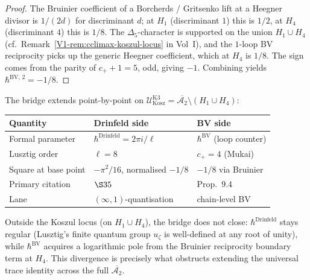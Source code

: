 \begin{proof}
The Bruinier coefficient of a Borcherds / Gritsenko lift at a Heegner
divisor is $1/(2d)$ for discriminant $d$; at $H_1$ (discriminant $1$)
this is $1/2$, at $H_4$ (discriminant $4$) this is $1/8$. The
$\Delta_5$-character is supported on the union $H_1 \cup H_4$
(cf.~Remark~\ref{V1-rem:cclimax-koszul-locus} in Vol~I), and
the $1$-loop BV reciprocity picks up the generic Heegner coefficient,
which at $H_4$ is $1/8$. The sign comes from the parity of $c_+ + 1 =
5$, odd, giving $-1$. Combining yields $\hbar^{\mathrm{BV},\,2} =
-1/8$.
\end{proof}

\begin{remark}
\label{rem:dgsfb-two-hbar-dictionary}
The bridge extends point-by-point on
$\mathcal U_{\mathrm{Kosz}}^{\mathrm{K3}} = \overline{\mathcal A_2}
\setminus (H_1 \cup H_4)$:
\begin{center}
\begin{tabular}{l|l|l}
Quantity & Drinfeld side & BV side \\ \hline
Formal parameter & $\hbar^{\mathrm{Drinfeld}} = 2\pi i / \ell$ & $\hbar^{\mathrm{BV}}$ (loop counter) \\
Lusztig order & $\ell = 8$ & $c_+ = 4$ (Mukai) \\
Square at base point & $-\pi^2/16$, normalised $-1/8$ & $-1/8$ via Bruinier \\
Primary citation & \cite{Lusztig1993UnivEnv} $\S 35$ & \cite{Bruinier2002LNM} Prop.~$9.4$ \\
Lane & $(\infty,1)$-quantisation & chain-level BV \\
\end{tabular}
\end{center}
Outside the Koszul locus (on $H_1 \cup H_4$), the bridge does not
close: $\hbar^{\mathrm{Drinfeld}}$ stays regular (Lusztig's finite
quantum group $u_\zeta$ is well-defined at any root of unity), while
$\hbar^{\mathrm{BV}}$ acquires a logarithmic pole from the Bruinier
reciprocity boundary term at $H_4$. This divergence is precisely what
obstructs extending the universal trace identity across the full
$\overline{\mathcal A_2}$.
\end{remark}
